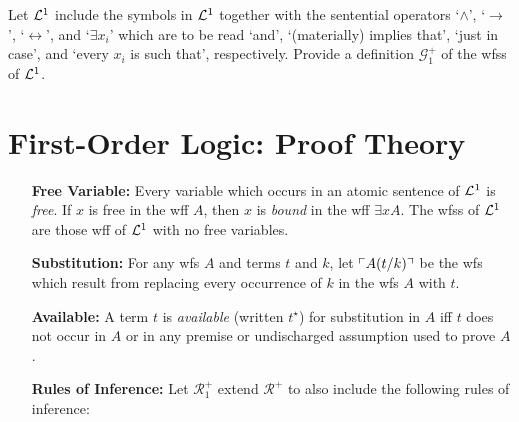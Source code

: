 \documentclass[a4paper, 11pt]{article} %
\begin{document}
Let $\mathcal{L}^1$ include the symbols in $\mathcal{L}^1$ together with the sentential operators `$\wedge$', `$\rightarrow$', `$\leftrightarrow$', and `$\exists x_i$' which are to be read `and', `(materially) implies that', `just in case', and `every $x_i$ is such that', respectively. Provide a definition $\mathcal{G}_1^+$ of the wfss of $\mathcal{L}^1$.




\section*{\sc First-Order Logic: Proof Theory}

\begin{enumerate}[leftmargin=1.2in] %
	\item[\bf Free Variable:] Every variable which occurs in an atomic sentence of $\mathcal{L}^1$ is \textit{free}. If $x$ is free in the wff $A$, then $x$ is \textit{bound} in the wff $\exists xA$. The wfss of $\mathcal{L}^1$ are those wff of $\mathcal{L}^1$ with no free variables.
	\item[\bf Substitution:] For any wfs ${A}$ and terms $t$ and $k$, let $\ulcorner A(t/k)\urcorner$ be the wfs which result from replacing every occurrence of $k$ in the wfs ${A}$ with $t$.
	\item[\bf Available:] A term $t$ is \textit{available} (written $t^\star$) for substitution in ${A}$ iff $t$ does not occur in ${A}$ or in any premise or undischarged assumption used to prove $A$.
	\item[\bf Rules of Inference:] Let $\mathcal{R}_1^+$ extend $\mathcal{R}^+$ to also include the following rules of inference:%
\end{enumerate}
\end{document}
